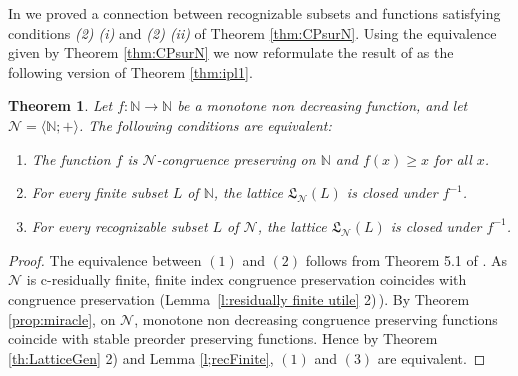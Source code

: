 \documentclass[11pt,a4paper]{article}
\newtheorem{theorem}{Theorem}[section]
\theoremstyle{definition} %
\newcommand\+[1]{\mathcal{#1}} %
\newcommand{\N}{{\mathbb N}}     %
\newcommand{\Latt}{{\mathfrak{L}}}
\begin{document}
In \cite{cgg14ipl} we proved a connection between recognizable subsets and 
functions satisfying conditions {\it (2) (i) } and {\it (2) (ii) } of Theorem \ref{thm:CPsurN}. Using the equivalence given by Theorem \ref{thm:CPsurN} we now  reformulate the result  of  \cite{cgg14ipl} as  the following version of Theorem \ref{thm:ipl1}.
%
\begin{theorem}\label{thm:ipl} %
Let $f:\N\longrightarrow\N$ be a monotone non decreasing function, 
and let $\+N=\langle\N;+\rangle$. The following conditions are equivalent:
\begin{enumerate}\setlength{\itemsep}{0pt}
\item[$(1)$] 
The function $f$ is $\+N$-congruence preserving on $\+\N$ and 
$f(x)\geq x$ for all $x$.
\item[$(2)$] 
For every finite subset $L$  of $\N$, the lattice $\Latt_\+N(L)$ is closed under $f^{-1}$.
\item[$(3)$] 
For every recognizable subset $L$ of $\+N$, the lattice $\Latt_{\+N}(L)$ is  closed under $f^{-1}$.
\end{enumerate}
\end{theorem}
%
 \begin{proof}  The equivalence between $(1)$ and $(2)$  follows from Theorem 5.1 of \cite{cgg14ipl}. As $\+N$ is c-residually finite, finite index congruence preservation coincides with congruence preservation (Lemma~\ref{l:residually finite utile} 2)\,).
By Theorem \ref{prop:miracle},  on $\+N$, monotone non decreasing congruence preserving functions coincide with stable preorder preserving functions.
  Hence by Theorem \ref{th:LatticeGen} 2) and Lemma \ref{l;recFinite}, $(1)$ and $(3)$ are equivalent.
\end{proof}




\end{document}
